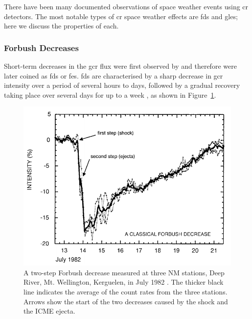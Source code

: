 There have been many documented observations of space weather events using \gls{cr} detectors. The most notable types of \gls{cr} space weather effects are \glspl{fd} and \glspl{gle}; here we discuss the properties of each.

\subsubsection*{Forbush Decreases}\label{sec:intro_FDs}

Short-term decreases in the \gls{gcr} flux were first observed by  \citet{forbush_effects_1937} and therefore were later coined as \glspl{fd} or \glspl{fe}. \glspl{fd} are characterised by a sharp decrease in \gls{gcr} intensity over a period of several hours to days, followed by a gradual recovery taking place over several days for up to a week \citep{cane_coronal_2000, belov_forbush_2008, wawrzynczak_modeling_2010}, as shown in Figure~\ref{fig:FD_plot}.

\begin{figure}[htb!]
	\centering
	\includegraphics[width=0.75\columnwidth]{FD_plot.png}
	\caption{A two-step Forbush decrease measured at three NM stations, Deep River, Mt. Wellington, Kerguelen, in July 1982 \citep{cane_coronal_2000}. The thicker black line indicates the average of the count rates from the three stations. Arrows show the start of the two decreases caused by the shock and the ICME ejecta.}
	\label{fig:FD_plot}
\end{figure}

